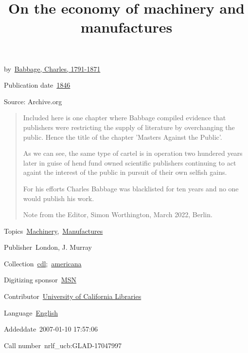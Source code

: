 \documentclass{article}
\begin{document}
\title{On the economy of machinery and manufactures}

\maketitle


by \href{https://archive.org/search.php?query=creator%3A%22Babbage%2C+Charles%2C+1791-1871%22}{Babbage, Charles, 1791-1871}


Publication date \href{https://archive.org/search.php?query=date:1846}{1846}


Source: Archive.org

\begin{quote}



Included here is one chapter where Babbage compiled evidence that publishers were restricting the supply of literature by overchanging the public. Hence the title of the chapter 'Masters Against the Public'.


As we can see, the same type of cartel is in operation two hundered years later in guise of hend fund owned scientific publishers continuing to act againt the interest of the public in pursuit of their own selfish gains.


For his efforts Charles Babbage was blacklisted for ten years and no one would publish his work.


Note from the Editor, Simon Worthington, March 2022, Berlin.


\end{quote}


Topics \href{https://archive.org/search.php?query=subject%3A%22Machinery%22}{Machinery}, \href{https://archive.org/search.php?query=subject%3A%22Manufactures%22}{Manufactures}


Publisher London, J. Murray


Collection \href{https://archive.org/details/cdl}{cdl}; \href{https://archive.org/details/americana}{americana}


Digitizing sponsor \href{https://archive.org/details/msn_books}{MSN}


Contributor \href{https://archive.org/details/university_of_california_libraries}{University of California Libraries}


Language \href{https://archive.org/search.php?query=%28language%3Aeng+OR+language%3A%22English%22%29}{English}


Addeddate 2007-01-10 17:57:06


Call number nrlf\_ucb:GLAD-17047997
\end{document}
